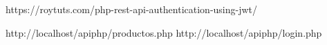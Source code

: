 https://roytuts.com/php-rest-api-authentication-using-jwt/

http://localhost/apiphp/productos.php
http://localhost/apiphp/login.php